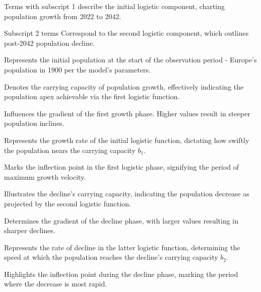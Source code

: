 
Terms with subscript 1 describe the initial logistic component, charting
population growth from 2022 to 2042.

Subscript 2 terms Correspond to the second logistic component, which outlines
post-2042 population decline.

\begin{description}[style=nextline, leftmargin=2cm]
      \item[\(\mathbf{b_1}\)] 
            Represents the initial population at the start of the observation period - Europe's population in 1900 per the model's parameters.

      \item[\(\mathbf{b_1}\)] 
            Denotes the carrying capacity of population growth, effectively indicating the population apex achievable via the first logistic function.

      \item[\(\mathbf{A_1}\)] 
            Influences the gradient of the first growth phase. Higher values result in steeper population inclines.

      \item[\(\mathbf{a_1}\)] 
            Represents the growth rate of the initial logistic function, dictating how swiftly the population nears the carrying capacity \( b_1 \).

      \item[\(\mathbf{t_1}\)] 
            Marks the inflection point in the first logistic phase, signifying the period of maximum growth velocity.

      \item[\(\mathbf{b_2}\)] 
            Illustrates the decline's carrying capacity, indicating the population decrease as projected by the second logistic function.

      \item[\(\mathbf{A_2}\)] 
            Determines the gradient of the decline phase, with larger values resulting in sharper declines.

      \item[\(\mathbf{a_2}\)] 
            Represents the rate of decline in the latter logistic function, determining the speed at which the population reaches the decline's carrying capacity \( b_2 \).

      \item[\(\mathbf{t_2}\)] 
            Highlights the inflection point during the decline phase, marking the period where the decrease is most rapid.
\end{description}


